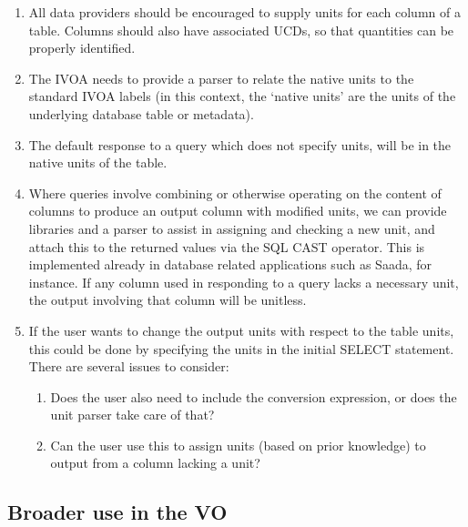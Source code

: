 \documentclass[12pt,notitlepage,onecolumn]{ivoa}
\begin{document}
\begin{enumerate}
\item All data providers should be encouraged to supply units for each column
of a table. Columns should also have associated UCDs, so that quantities can be
properly identified.

\item The IVOA needs to provide a parser to relate the native units to the standard IVOA
labels (in this context, the `native units' are the units of the
underlying database table or metadata).   

\item
The default response to a query which does not specify units, will be
in the native units of the table. 

\item
Where queries involve combining or otherwise operating on the content
of columns to produce an output column with modified units, we can
provide libraries and a parser to assist in assigning and checking a
new unit, and attach this to the returned values via the SQL CAST
operator. 
This is implemented already in database related applications such as Saada, for instance. 
If any column used in responding to a query lacks a necessary unit, the output
involving that column will be unitless.

\item
If the user wants to change the output units with respect to the table
units, this could be done by specifying the units in the initial
SELECT statement. There are several issues to consider: 
	\begin{enumerate}
	\item Does the user also need to include the conversion expression, or does the unit
parser take care of that?  
	\item Can the user use this to assign units (based on prior knowledge) to output from a 
column lacking a unit?
	\end{enumerate}
\end{enumerate} 


\subsection{Broader use in the VO}
\end{document}
